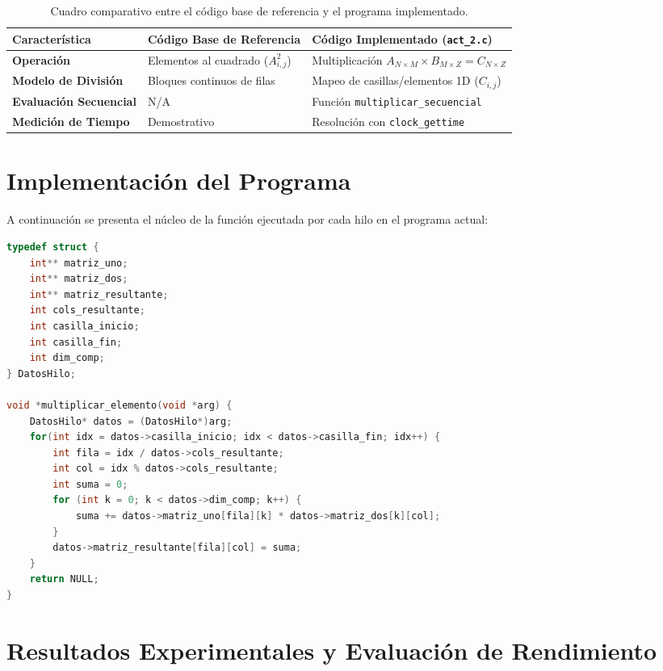 \documentclass[runningheads]{llncs}
\begin{document}
\begin{table}[h!]
\centering
\caption{Cuadro comparativo entre el código base de referencia y el programa implementado.}
\label{tab:comparativa}
\begin{tabular}{lll}
\toprule
\textbf{Característica} & \textbf{Código Base de Referencia} & \textbf{Código Implementado (\texttt{act\_2.c})} \\
\midrule
\textbf{Operación} & Elementos al cuadrado ($A_{i,j}^2$) & Multiplicación $A_{N \times M} \times B_{M \times Z} = C_{N \times Z}$ \\
\textbf{Modelo de División} & Bloques continuos de filas & Mapeo de casillas/elementos 1D ($C_{i,j}$) \\
\textbf{Evaluación Secuencial} & N/A & Función \texttt{multiplicar\_secuencial} \\
\textbf{Medición de Tiempo} & Demostrativo & Resolución con \texttt{clock\_gettime} \\
\bottomrule
\end{tabular}
\end{table}

\section{Implementación del Programa}

A continuación se presenta el núcleo de la función ejecutada por cada hilo en el programa actual:

\begin{lstlisting}[language=C, caption={Función de multiplicación por casilla en el código implementado.}]
typedef struct {
    int** matriz_uno;
    int** matriz_dos;
    int** matriz_resultante; 
    int cols_resultante;
    int casilla_inicio; 
    int casilla_fin;
    int dim_comp;
} DatosHilo;

void *multiplicar_elemento(void *arg) {
    DatosHilo* datos = (DatosHilo*)arg;
    for(int idx = datos->casilla_inicio; idx < datos->casilla_fin; idx++) {
        int fila = idx / datos->cols_resultante;
        int col = idx % datos->cols_resultante;
        int suma = 0;
        for (int k = 0; k < datos->dim_comp; k++) {
            suma += datos->matriz_uno[fila][k] * datos->matriz_dos[k][col];
        }
        datos->matriz_resultante[fila][col] = suma;
    }
    return NULL;
}
\end{lstlisting}

\section{Resultados Experimentales y Evaluación de Rendimiento}
\end{document}
